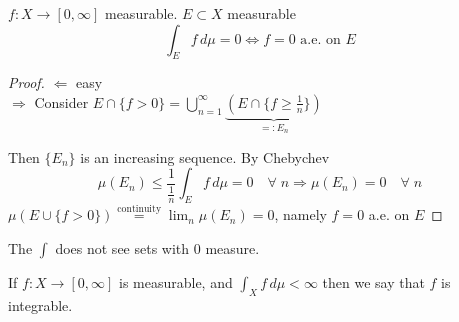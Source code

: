 \begin{theorem}
    \(f: X \to \left[0, \infty\right]\) measurable. \(E \subset X \) measurable 
    \[\int_E f \, d\mu =0 \Leftrightarrow f=0 \text{ a.e. on } E \]
\end{theorem}
\begin{proof}
    \( \Leftarrow \) easy \\
    \( \Rightarrow \) Consider \( E \cap \{f >0\} = \bigcup_{n=1}^\infty \underbrace{\left(E \cap \{ f \geq \frac{1}{n} \} \right)}_{=:E_n} \) 
    
    Then \(\{E_n\}\) is an increasing sequence. By Chebychev 
    \[
        \mu (E_n) \leq \frac{1}{\frac{1}{n}} \int_E f \, d\mu =0 \quad \forall \; n \Rightarrow \mu(E_n)=0 \quad \forall \; n 
    \]
    \(\mu(E \cup \{f>0\}) \overset{\text{continuity}}{=} \lim_n \mu (E_n)=0\), namely \(f=0\) a.e. on \(E\)
\end{proof}

The \(\int\) does not see sets with 0 measure.

\begin{definition}
    If \( f:X \to \left[0, \infty\right] \) is measurable, and \( \int_X f \, d\mu < \infty \) then we say that \(f\) is integrable.
\end{definition}
